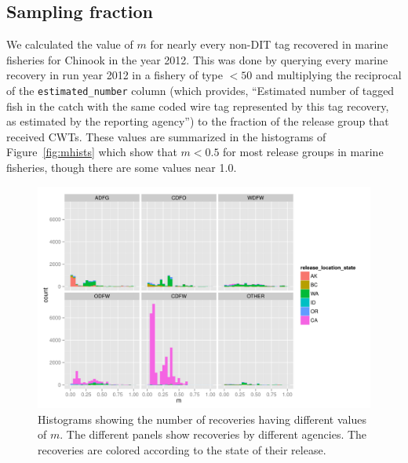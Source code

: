 \documentclass[11pt]{article}
\begin{document}
\subsection{Sampling fraction}
We calculated the value of $m$ for nearly every non-DIT tag recovered in marine fisheries
for Chinook in the year 2012.  This was done by querying every marine recovery in
run year 2012 in a fishery of type $<50$  and multiplying the reciprocal of the {\tt estimated\_number} column
(which provides, ``Estimated number of tagged fish in the catch with the same coded wire
tag represented by this tag recovery, as estimated by the reporting agency'') to the
fraction of the release group that received CWTs. These values are summarized in the 
histograms of Figure~\ref{fig:mhists} which show that $m < 0.5$ for most release groups
in marine fisheries, though there are some values near 1.0.
\begin{figure}
\centering
\includegraphics[width = \textwidth]{./images/m_histo_chinook.pdf}
\caption{Histograms showing the number of recoveries having different values of $m$.  The different
panels show recoveries by different agencies.  The recoveries are colored according to the 
state of their release.}
\end{figure}
  
\end{document}
